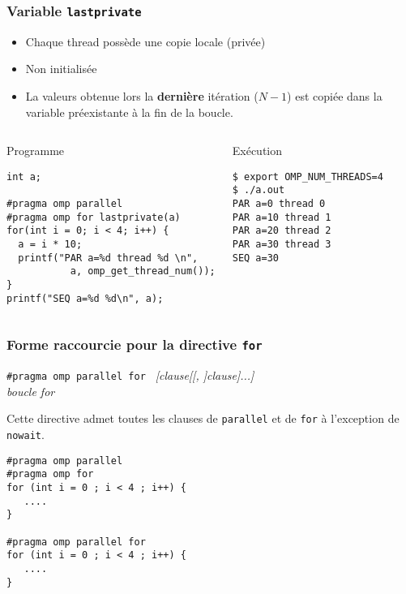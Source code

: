\documentclass{beamer}
\begin{document}
\begin{frame}[fragile]
  \frametitle{Variable {\tt lastprivate}}

  \begin{itemize}
  \item Chaque thread possède une copie locale (privée)
  \item \alert{Non initialisée}
  \item La valeurs obtenue lors la \textbf{dernière} itération ($N-1$)
    est copiée dans la variable préexistante à la fin de la boucle.
  \end{itemize}

  \begin{columns}[t]
  \column{5.5cm}
  \begin{block}{Programme}
\begin{verbatim}
int a;
  
#pragma omp parallel 
#pragma omp for lastprivate(a)
for(int i = 0; i < 4; i++) {
  a = i * 10;
  printf("PAR a=%d thread %d \n",
           a, omp_get_thread_num());
}
printf("SEQ a=%d %d\n", a);
\end{verbatim}
\end{block}
  
  \column{5cm}
  
  \begin{block}{Exécution}
    \small
\begin{verbatim}
$ export OMP_NUM_THREADS=4
$ ./a.out 
PAR a=0 thread 0
PAR a=10 thread 1
PAR a=20 thread 2
PAR a=30 thread 3
SEQ a=30
\end{verbatim}
  \end{block}  
\end{columns}


\normalsize
\end{frame}


\begin{frame}[fragile]
  \frametitle{Forme raccourcie pour la directive {\tt for}}
  
\begin{framed}
  {\tt \#pragma omp parallel for } {\it  [clause[[, ]clause]...]}  \\
  {\it boucle for} 
\end{framed}

Cette directive admet toutes les clauses de {\tt parallel} et de {\tt for} à
l'exception de {\tt nowait}. 

\medskip

\begin{verbatim}
#pragma omp parallel
#pragma omp for
for (int i = 0 ; i < 4 ; i++) {
   ....
}

#pragma omp parallel for
for (int i = 0 ; i < 4 ; i++) {
   ....
}
\end{verbatim}
\end{frame}
\end{document}
